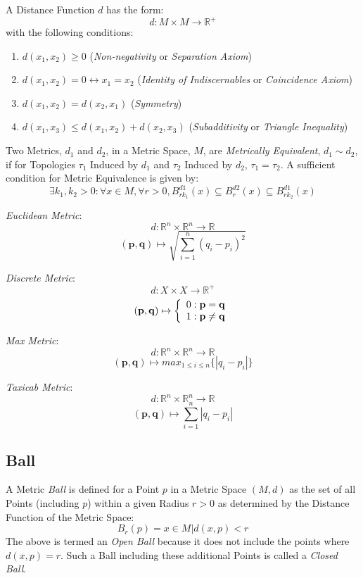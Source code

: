 A Distance Function $d$ has the form:
\[
  d: M \times M \rightarrow \mathbb{R}^{+}
\]
with the following conditions:
\begin{enumerate}
\item $d(x_1, x_2) \geq 0$ (\emph{Non-negativity} or \emph{Separation
  Axiom})
\item $d(x_1, x_2) = 0 \leftrightarrow x_1 = x_2$ (\emph{Identity of
  Indiscernables} or \emph{Coincidence Axiom})
\item $d(x_1, x_2) = d(x_2, x_1)$ (\emph{Symmetry})
\item $d(x_1, x_3) \leq d(x_1, x_2) + d(x_2, x_3)$
  (\emph{Subadditivity} or \emph{Triangle Inequality})
\end{enumerate}
Two Metrics, $d_1$ and $d_2$, in a Metric Space, $M$, are
\emph{Metrically Equivalent}, $d_1 \sim d_2$, if for Topologies
$\tau_1$ Induced by $d_1$ and $\tau_2$ Induced by $d_2$, $\tau_1 =
\tau_2$. A sufficient condition for Metric Equivalence is given by:
\[
  \exists k_1, k_2 > 0 : \forall x \in M, \forall r > 0,
  B^{d1}_{rk_1}(x) \subseteq B^{d2}_r (x) \subseteq B^{d1}_{rk_2}(x)
\]

\emph{Euclidean Metric}:
\[
  d: \mathbb{R}^n \times \mathbb{R}^n \rightarrow \mathbb{R}
\]\[
  (\mathbf{p},\mathbf{q}) \mapsto \sqrt{\sum_{i=1}^{n}(q_i - p_i)^2}
\]

\emph{Discrete Metric}:
\[
  d: X \times X \rightarrow \mathbb{R}^{+}
\]\[
  (\mathbf{p},\mathbf{q}) \mapsto \left\{
  \begin{array}{l l}
    0: \mathbf{p} = \mathbf{q}\\
    1: \mathbf{p} \neq \mathbf{q}
  \end{array}\right.
\]

\emph{Max Metric}:
\[
  d: \mathbb{R}^n \times \mathbb{R}^n \rightarrow \mathbb{R}
\]\[
  (\mathbf{p},\mathbf{q}) \mapsto max_{1 \leq i \leq n}\{|q_i - p_i|\}
\]

\emph{Taxicab Metric}:
\[
  d: \mathbb{R}^n \times \mathbb{R}^n \rightarrow \mathbb{R}
\]\[
  (\mathbf{p},\mathbf{q}) \mapsto \sum_{i=1}^{n}|q_i - p_i|
\]



\subsection{Ball}\label{sec:ball}

A Metric \emph{Ball} is defined for a Point $p$ in a Metric Space
$(M,d)$ as the set of all Points (including $p$) within a given Radius
$r > 0$ as determined by the Distance Function of the Metric Space:
\[
  B_r(p) = {x \in M | d(x,p) < r }
\]
The above is termed an \emph{Open Ball} because it does not include
the points where $d(x,p) = r$. Such a Ball including these additional
Points is called a \emph{Closed Ball}.

